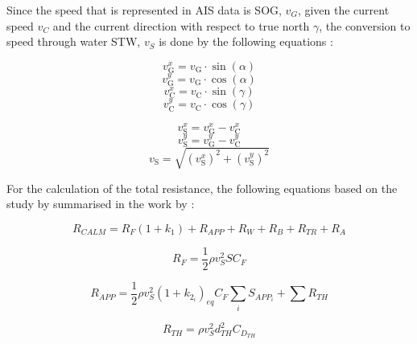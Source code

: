 \documentclass[]{interact}
\theoremstyle{plain}%
\theoremstyle{definition}
\theoremstyle{remark}
\begin{document}
Since the speed that is represented in AIS data is SOG, $v_G$, given the current speed $v_C$ and the current direction with respect to true north $\gamma$, the conversion to speed through water STW, $v_S$ is done by the following equations \citep{Kim.2020b}:

\begin{equation}\label{eqn:sogx}
  v_{\text{G}}^x = v_{\text{G}}\cdot\sin(\alpha)   
\end{equation}
\begin{equation}\label{eqn:sogy}
  v_{\text{G}}^y = v_{\text{G}}\cdot\cos(\alpha)   
\end{equation} 
\begin{equation}\label{eqn:vcurrx}
   v_{\text{C}}^x = v_{\text{C}}\cdot\sin(\gamma)   
\end{equation}
\begin{equation}\label{eqn:vcurry}
  v_{\text{C}}^y = v_{\text{C}}\cdot\cos(\gamma)   
\end{equation}

\begin{equation}\label{eqn:stwx}
  v_{\text{S}}^x = v_{\text{G}}^x - v_{\text{C}}^x    
\end{equation}
\begin{equation}\label{eqn:stwy}
  v_{\text{S}}^y = v_{\text{G}}^y - v_{\text{C}}^y      
\end{equation}
\begin{equation}\label{eqn:stwabs}
  v_{\text{S}} = \sqrt{(v_{\text{S}}^x)^2 + (v_{\text{S}}^y)^2} 
\end{equation}

For the calculation of the total resistance, the following equations based on the study by \citet{Holtrop.1978,Holtrop.1982,Holtrop.1984} summarised in the work by \citet{Birk.2019}:

\begin{equation}\label{eqn:R_calm}
  R_{CALM} = R_F(1+k_1) + R_{APP} + R_W + R_B + R_{TR} + R_A
\end{equation}

\begin{equation}\label{eqn:R_f}
  R_F = \frac{1}{2}\rho v_{S}^2 S C_F 
\end{equation}

\begin{equation}\label{eqn:R_app}
  R_{APP} = \frac{1}{2}\rho v_S^2 (1+k_{2_i})_{eq} C_F \sum_i S_{APP_i} + \sum R_{TH}
\end{equation}

\begin{equation}
  \label{eqn:R_th}
  R_{TH} = \rho v_S^2  d_{TH}^2 C_{D_{TH}}
\end{equation}
\end{document}
